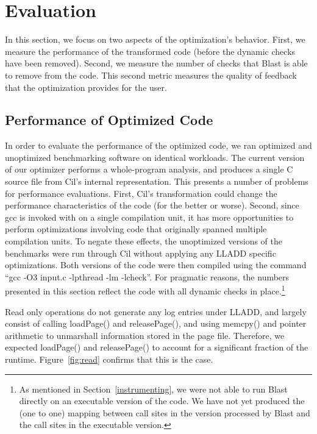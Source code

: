\documentclass[10pt,letterpaper,twocolumn,english]{article}
\newcommand{\yad}{LLADD\xspace}
\newcommand{\pin}{loadPage()\xspace}
\newcommand{\unpin}{releasePage()\xspace}
\begin{document}
\section{Evaluation}

In this section, we focus on two aspects of the optimization's
behavior.  First, we measure the performance of the transformed code
(before the dynamic checks have been removed).  Second, we measure the
number of checks that Blast is able to remove from the code.  This
second metric measures the quality of feedback that the optimization
provides for the user.

\subsection{Performance of Optimized Code}
\label{codePerformance}

In order to evaluate the performance of the optimized code, we ran
optimized and unoptimized benchmarking software on identical
workloads.  The current version of our optimizer performs a
whole-program analysis, and produces a single C source file from Cil's
internal representation.  This presents a number of problems for
performance evaluations.  First, Cil's transformation could change the
performance characteristics of the code (for the better or worse).
Second, since gcc is invoked with on a single compilation unit, it has
more opportunities to perform optimizations involving code that
originally spanned multiple compilation units.  To negate these
effects, the unoptimized versions of the benchmarks were run through
Cil without applying any \yad specific optimizations.  Both versions
of the code were then compiled using the command ``gcc -O3 input.c
-lpthread -lm -lcheck''.  For pragmatic reasons, the numbers presented
in this section reflect the code with all dynamic checks in
place.\footnote{As mentioned in Section~\ref{instrumenting}, we were
not able to run Blast directly on an executable version of the code.
We have not yet produced the (one to one) mapping between call sites
in the version processed by Blast and the call sites in the executable version.}

Read only operations do not generate any log entries under \yad, and
largely consist of calling \pin and \unpin, and using memcpy() and
pointer arithmetic to unmarshall information stored in the page file.
Therefore, we expected \pin and \unpin to account for a significant
fraction of the runtime.  Figure~\ref{fig:read} confirms that this is
the case.
\end{document}
